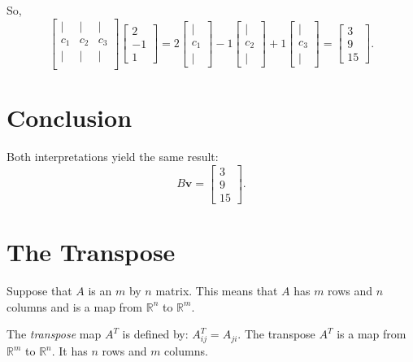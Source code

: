 So,
\[
\begin{bmatrix}
| & | & | \\
c_1 & c_2 & c_3 \\
| & | & | \\
\end{bmatrix}
\begin{bmatrix}
2 \\ -1 \\ 1
\end{bmatrix}
=
2 \begin{bmatrix} | \\ c_1 \\ | \end{bmatrix}
- 1 \begin{bmatrix} | \\ c_2 \\ | \end{bmatrix}
+ 1 \begin{bmatrix} | \\ c_3 \\ | \end{bmatrix}
=
\begin{bmatrix}
3 \\ 9 \\ 15
\end{bmatrix}.
\]

\section*{Conclusion}

Both interpretations yield the same result:
\[
B\mathbf{v} = \begin{bmatrix} 3 \\ 9 \\ 15 \end{bmatrix}.
\]



\section{The Transpose}

Suppose that $A$ is an $m$ by $n$ matrix. This means that $A$ has $m$ rows and $n$ columns and is a map from $\mathbb{R}^n$ to $\mathbb{R}^m$. 

The \emph{transpose} map $A^T$ is defined by: $A^T_{ij} = A_{ji}$. The transpose $A^T$ is a map from $\mathbb{R}^m$ to $\mathbb{R}^n$. It has $n$ rows and $m$ columns. 


